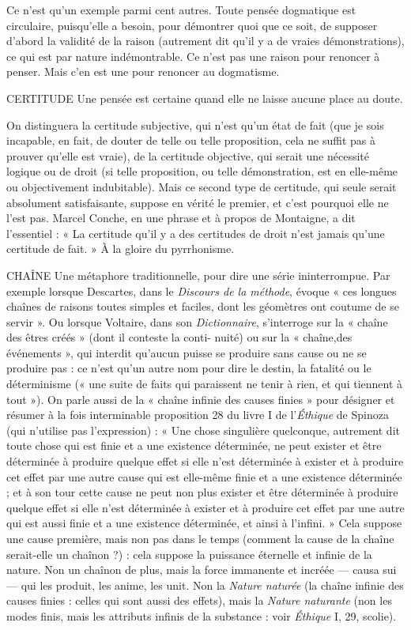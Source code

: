 Ce n’est qu’un exemple parmi cent autres. Toute pensée dogmatique est
circulaire, puisqu’elle a besoin, pour démontrer quoi que ce soit, de supposer
d’abord la validité de la raison (autrement dit qu’il y a de vraies démonstrations),
ce qui est par nature indémontrable. Ce n’est pas une raison pour
renoncer à penser. Mais c’en est une pour renoncer au dogmatisme.

CERTITUDE Une pensée est certaine quand elle ne laisse aucune place au
doute.

On distinguera la certitude subjective, qui n’est qu’un état de fait (que je
sois incapable, en fait, de douter de telle ou telle proposition, cela ne suffit pas
à prouver qu’elle est vraie), de la certitude objective, qui serait une nécessité
logique ou de droit (si telle proposition, ou telle démonstration, est en elle-même
ou objectivement indubitable). Mais ce second type de certitude, qui
seule serait absolument satisfaisante, suppose en vérité le premier, et c’est pourquoi
elle ne l’est pas. Marcel Conche, en une phrase et à propos de Montaigne,
a dit l’essentiel : « La certitude qu’il y a des certitudes de droit n’est jamais
qu’une certitude de fait. » À la gloire du pyrrhonisme.

CHAÎNE Une métaphore traditionnelle, pour dire une série ininterrompue.
Par exemple lorsque Descartes, dans le {\it Discours de la
méthode}, évoque « ces longues chaînes de raisons toutes simples et faciles, dont
les géomètres ont coutume de se servir ». Ou lorsque Voltaire, dans son {\it Dictionnaire},
s'interroge sur la « chaîne des êtres créés » (dont il conteste la conti-
nuité) ou sur la « chaîne,des événements », qui interdit qu'aucun puisse se produire
sans cause ou ne se produire pas : ce n’est qu’un autre nom pour dire le
destin, la fatalité ou le déterminisme (« une suite de faits qui paraissent ne tenir
à rien, et qui tiennent à tout »). On parle aussi de la « chaîne infinie des causes
finies » pour désigner et résumer à la fois interminable proposition 28 du
livre I de l'{\it Éthique} de Spinoza (qui n'utilise pas l'expression) : « Une chose singulière
quelconque, autrement dit toute chose qui est finie et a une existence
déterminée, ne peut exister et être déterminée à produire quelque effet si elle
n’est déterminée à exister et à produire cet effet par une autre cause qui est elle-même
finie et a une existence déterminée ; et à son tour cette cause ne peut non
plus exister et être déterminée à produire quelque effet si elle n’est déterminée
à exister et à produire cet effet par une autre qui est aussi finie et a une existence
déterminée, et ainsi à l’infini. » Cela suppose une cause première, mais non pas
dans le temps (comment la cause de la chaîne serait-elle un chaînon ?) : cela
suppose la puissance éternelle et infinie de la nature. Non un chaînon de plus,
mais la force immanente et incréée — causa sui — qui les produit, les anime, les
unit. Non la {\it Nature naturée} (la chaîne infinie des causes finies : celles qui sont
aussi des effets), mais la {\it Nature naturante} (non les modes finis, mais les attributs
infinis de la substance : voir {\it Éthique} I, 29, scolie).

